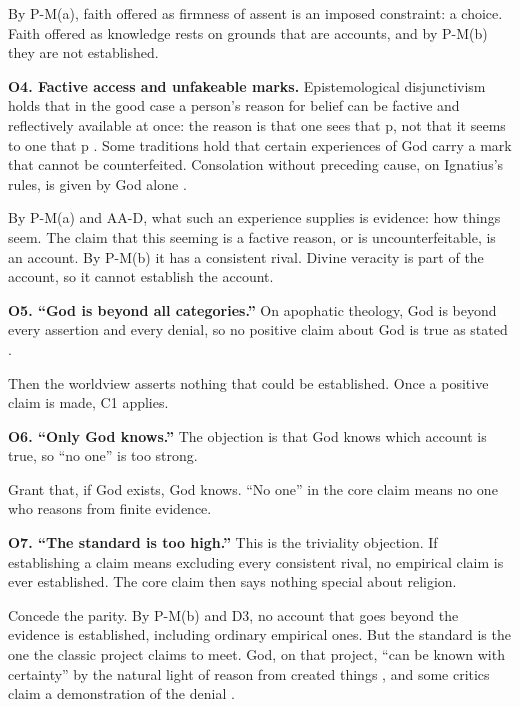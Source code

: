 By P-M(a), faith offered as firmness of assent is an imposed constraint: a choice. Faith offered as
knowledge rests on grounds that are accounts, and by P-M(b) they are not established.

\medskip\noindent\textbf{O4. Factive access and unfakeable marks.}\label{item:O4}
Epistemological disjunctivism holds that in the good case a person's reason for belief can be
factive and reflectively available at once: the reason is that one sees that p, not that it
seems to one that p \citep{pritchard2012}. Some traditions hold that certain experiences of God
carry a mark that cannot be counterfeited. Consolation without preceding cause, on Ignatius's
rules, is given by God alone \citep[\S330]{ignatius-exercises}.

By P-M(a) and AA-D, what such an experience supplies is evidence: how things seem. The claim that this seeming is a factive reason, or is
uncounterfeitable, is an account. By P-M(b) it has a consistent rival. Divine veracity is part of
the account, so it cannot establish the account.

\medskip\noindent\textbf{O5. ``God is beyond all categories.''}\label{item:O5}
On apophatic theology, God is beyond every assertion and every denial, so no positive claim about
God is true as stated \citep{dionysius-mt}.

Then the worldview asserts nothing that could be established. Once a positive claim is made, C1
applies.

\medskip\noindent\textbf{O6. ``Only God knows.''}\label{item:O6}
The objection is that God knows which account is true, so ``no one'' is too strong.

Grant that, if God exists, God knows. ``No one'' in the core claim means no one who reasons from
finite evidence.

\medskip\noindent\textbf{O7. ``The standard is too high.''}\label{item:O7}
This is the triviality objection. If establishing a claim means excluding every consistent rival,
no empirical claim is ever established. The core claim then says nothing special about religion.

Concede the parity. By P-M(b) and D3, no account that goes beyond the evidence is established,
including ordinary empirical ones. But
the standard is the one the classic project claims to meet. God, on that project, ``can be known
with certainty'' by the natural light of reason from created things \citep[ch.~2]{vatican1870},
and some critics claim a demonstration of the denial \citep{mackie1955,findlay1948}.

